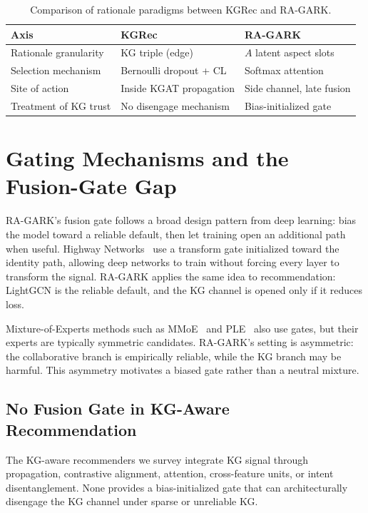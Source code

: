 \begin{table}[!htbp]
\centering
\caption{Comparison of rationale paradigms between KGRec and RA-GARK.}
\label{tab:rw-kgrec-vs-ragark}
\begin{tabular}{l l l}
\toprule
Axis & KGRec & RA-GARK \\
\midrule
Rationale granularity & KG triple (edge)         & $A$ latent aspect slots \\
Selection mechanism   & Bernoulli dropout + CL   & Softmax attention \\
Site of action        & Inside KGAT propagation  & Side channel, late fusion \\
Treatment of KG trust & No disengage mechanism   & Bias-initialized gate \\
\bottomrule
\end{tabular}
\end{table}
\FloatBarrier

\section{Gating Mechanisms and the Fusion-Gate Gap}
\label{sec:rw-gating}

RA-GARK's fusion gate follows a broad design pattern from deep learning: bias the model toward a reliable default, then let training open an additional path when useful. Highway Networks~\cite{srivastava2015highway} use a transform gate initialized toward the identity path, allowing deep networks to train without forcing every layer to transform the signal. RA-GARK applies the same idea to recommendation: LightGCN is the reliable default, and the KG channel is opened only if it reduces loss.

Mixture-of-Experts methods such as MMoE~\cite{ma2018mmoe} and PLE~\cite{tang2020ple} also use gates, but their experts are typically symmetric candidates. RA-GARK's setting is asymmetric: the collaborative branch is empirically reliable, while the KG branch may be harmful. This asymmetry motivates a biased gate rather than a neutral mixture.

\subsection{No Fusion Gate in KG-Aware Recommendation}
\label{sec:rw-gating-gap}

The KG-aware recommenders we survey integrate KG signal through propagation, contrastive alignment, attention, cross-feature units, or intent disentanglement. None provides a bias-initialized gate that can architecturally disengage the KG channel under sparse or unreliable KG.

